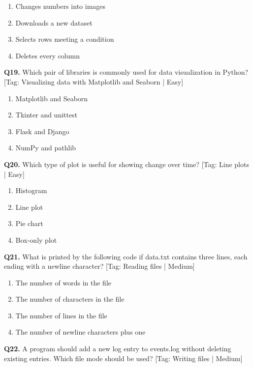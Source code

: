 \begin{enumerate}[label=(\alph*),topsep=2pt,itemsep=1pt,partopsep=0pt,parsep=0pt]
    \item {Changes numbers into images}
    \item {Downloads a new dataset}
    \item {Selects rows meeting a condition}
    \item {Deletes every column}
\end{enumerate}
\vspace{2mm}
\noindent\textbf{Q19.} Which pair of libraries is commonly used for data visualization in Python? \hfill [Tag: Visualizing data with Matplotlib and Seaborn | Easy]
\begin{enumerate}[label=(\alph*),topsep=2pt,itemsep=1pt,partopsep=0pt,parsep=0pt]
    \item {Matplotlib and Seaborn}
    \item {Tkinter and unittest}
    \item {Flask and Django}
    \item {NumPy and pathlib}
\end{enumerate}
\vspace{2mm}
\noindent\textbf{Q20.} Which type of plot is useful for showing change over time? \hfill [Tag: Line plots | Easy]
\begin{enumerate}[label=(\alph*),topsep=2pt,itemsep=1pt,partopsep=0pt,parsep=0pt]
    \item {Histogram}
    \item {Line plot}
    \item {Pie chart}
    \item {Box-only plot}
\end{enumerate}
\vspace{2mm}
\noindent\textbf{Q21.} What is printed by the following code if data.txt contains three lines, each ending with a newline character? \hfill [Tag: Reading files | Medium]
\begin{enumerate}[label=(\alph*),topsep=2pt,itemsep=1pt,partopsep=0pt,parsep=0pt]
    \item {The number of words in the file}
    \item {The number of characters in the file}
    \item {The number of lines in the file}
    \item {The number of newline characters plus one}
\end{enumerate}
\vspace{2mm}
\noindent\textbf{Q22.} A program should add a new log entry to events.log without deleting existing entries. Which file mode should be used? \hfill [Tag: Writing files | Medium]
